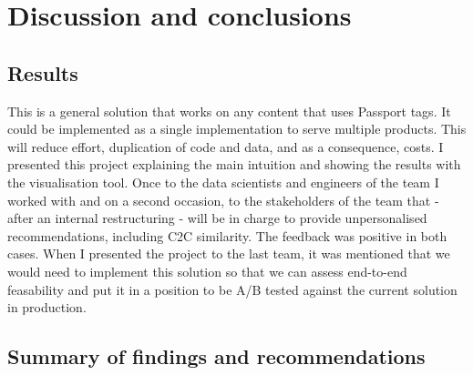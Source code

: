 \section{Discussion and conclusions}

\subsection{Results}

This is a general solution that works on any content that uses Passport tags. It could be implemented as a single implementation
to serve multiple products. This will reduce effort, duplication of code and data, and as a consequence, costs.
I presented this project explaining the main intuition and showing the results with the visualisation tool.
Once to the data scientists and engineers of the team I worked with and on a second occasion,
to the stakeholders of the team that - after an internal restructuring - will be in charge to provide unpersonalised recommendations,
including C2C similarity. The feedback was positive in both cases. When I presented the project to the last team, it was mentioned
that we would need to implement this solution so that we can assess end-to-end feasability and put it in a position to be A/B tested
against the current solution in production.

\subsection{Summary of findings and recommendations}

